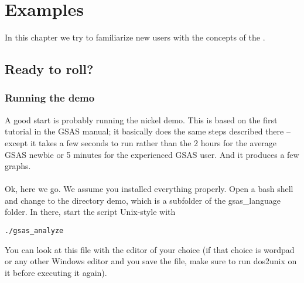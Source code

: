 \chapter{Examples}

In this chapter we try to familiarize new users with the concepts of the \gl.
\section{Ready to roll?}

\subsection{Running the demo}
A good start is probably running the nickel demo. This is based on the first tutorial in the GSAS manual; it basically does the same steps described there -- except it takes a few seconds to run rather than the 2 hours for the average GSAS newbie or 5 minutes for the experienced GSAS user. And it produces a few graphs.\\ \\
Ok, here we go. We assume you installed everything properly. Open a bash shell and change to the directory demo, which is a subfolder of the gsas\_language folder. In there, start the script Unix-style with

\verb=./gsas_analyze=

You can look at this file with the editor of your choice (if that choice is wordpad or any other Windows editor and you save the file, make sure to run dos2unix on it before executing it again). 

